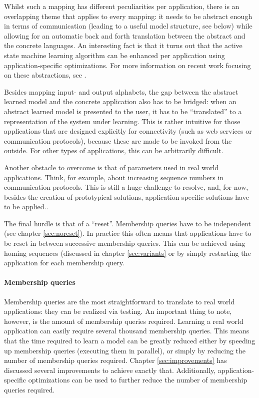 \documentclass[multi,crop=false,class=article]{standalone}
\begin{document}
Whilst such a mapping has different peculiarities per application, there is an
overlapping theme that applies to every mapping: it needs to be abstract enough
in terms of communication (leading to a useful model structure, see below) while
allowing for an automatic back and forth translation between the abstract and
the concrete languages\cite{Steffen11a}. An interesting fact is that it turns
out that the active state machine learning algorithm can be enhanced per
application using application-specific optimizations\cite{Hungar03}. For more
information on recent work focusing on these abstractions, see
\cite{Aarts10,Howar11,Jonsson11}.

Besides mapping input- and output alphabets, the gap between the abstract
learned model and the concrete application also has to be bridged: when an
abstract learned model is presented to the user, it has to be ``translated'' to
a representation of the system under learning. This is rather intuitive for
those applications that are designed explicitly for connectivity (such as web
services or communication protocols), because these are made to be invoked from
the outside. For other types of applications, this can be arbitrarily difficult.

Another obstacle to overcome is that of parameters used in real world
applications. Think, for example, about increasing sequence numbers in
communication protocols. This is still a huge challenge to
resolve\cite{Steffen11a}, and, for now, besides the creation of prototypical
solutions\cite{Aarts10,Shahbaz07,Howar10}, application-specific solutions have
to be applied.\cite{Steffen11a}.

The final hurdle is that of a ``reset''. Membership queries have to be
independent (see chapter \cref{sec:noreset}). In practice this often means that
applications have to be reset in between successive membership queries. This can
be achieved using homing sequences\cite{Rivest93} (discussed in chapter
\cref{sec:variants} or by simply restarting the application for each membership
query.

\paragraph{Membership queries} Membership queries are the most straightforward
to translate to real world applications: they can be realized via testing. An
important thing to note, however, is the amount of membership queries required.
Learning a real world application can easily require several thousand membership
queries. This means that the time required to learn a model
can be greatly reduced either by speeding up membership queries (executing them
in parallel), or simply by reducing the number of membership queries required.
Chapter \cref{sec:improvements} has discussed several improvements to achieve
exactly that. Additionally, application-specific optimizations can be used to
further reduce the number of membership queries required.
\end{document}
